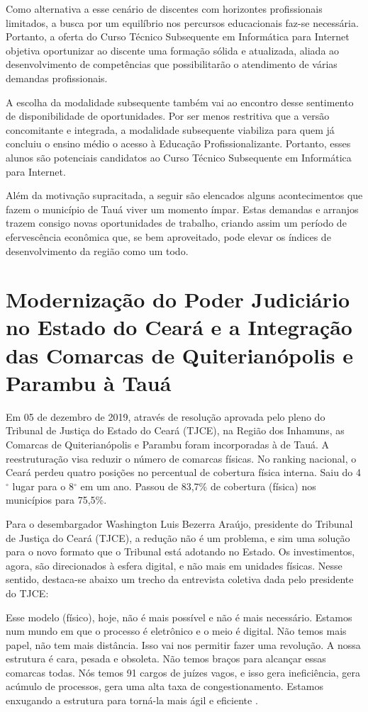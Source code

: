 \documentclass[
	12pt,				%
	openright,			%
	twoside,			%
	a4paper,			%
	chapter=TITLE,		%
	english,			%
	french,				%
	spanish,			%
	brazil,				%
	]{abntex2}
\begin{document}
 Como alternativa a esse cenário de discentes com horizontes profissionais limitados, a busca por um equilíbrio nos percursos educacionais  faz-se necessária. Portanto, a oferta do Curso Técnico Subsequente em Informática para Internet objetiva oportunizar ao discente uma formação sólida e atualizada, aliada ao desenvolvimento de competências que possibilitarão o atendimento de várias demandas profissionais.
 
A escolha da modalidade subsequente também vai ao encontro desse sentimento de disponibilidade de oportunidades. Por ser menos restritiva que a versão concomitante e integrada, a modalidade subsequente viabiliza para quem já concluiu o ensino médio o acesso à Educação Profissionalizante. Portanto, esses alunos são potenciais candidatos ao Curso Técnico Subsequente em Informática para Internet.

Além da motivação supracitada, a seguir são elencados alguns acontecimentos que fazem o município de Tauá viver um momento ímpar. Estas demandas e arranjos trazem consigo novas oportunidades de trabalho, criando assim um período de efervescência econômica que, se bem aproveitado, pode elevar os índices de desenvolvimento da região como um todo.

\section{Modernização do Poder Judiciário no Estado do Ceará e a Integração das Comarcas de Quiterianópolis e Parambu \`a Tauá}

Em 05 de dezembro de 2019, através de resolução aprovada pelo pleno do Tribunal de Justiça do Estado do Ceará (TJCE), na Região dos Inhamuns, as Comarcas de Quiterianópolis e Parambu foram incorporadas \`a de Tauá. 
A reestruturação visa reduzir o número de comarcas físicas. No ranking nacional, o Ceará perdeu quatro posições no percentual de cobertura física interna. Saiu do 4$^\circ$ lugar para o 8$^\circ$ em um ano. Passou de 83,7\% de cobertura (física) nos municípios para 75,5\%.

Para o desembargador Washington Luis Bezerra Araújo, presidente do Tribunal de Justiça do Ceará (TJCE), a redução não é um problema, e sim uma solução para o novo formato que o Tribunal está adotando no Estado. Os investimentos, agora, são direcionados à esfera digital, e não mais em unidades físicas. Nesse sentido, destaca-se abaixo um trecho da entrevista coletiva dada pelo presidente do TJCE:

\begin{citacao}
Esse modelo (físico), hoje, não é mais possível e não é mais necessário. Estamos num mundo em que o processo é eletrônico e o meio é digital. Não temos mais papel, não tem mais distância. Isso vai nos permitir fazer uma revolução. A nossa estrutura é cara, pesada e obsoleta. Não temos braços para alcançar essas comarcas todas. Nós temos 91 cargos de juízes vagos, e isso gera ineficiência, gera acúmulo de processos, gera uma alta taxa de congestionamento. Estamos enxugando a estrutura para torná-la mais ágil e eficiente \cite{teste}.
\end{citacao}
\end{document}
